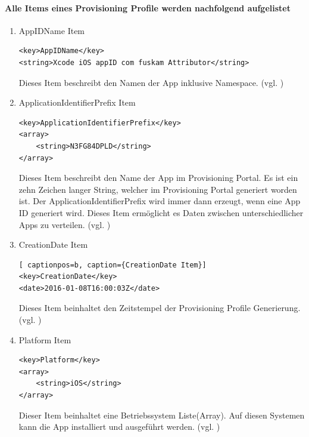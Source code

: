\paragraph{Alle Items eines Provisioning Profile werden nachfolgend aufgelistet}
\begin{enumerate}
    \item AppIDName Item

\begin{lstlisting}[captionpos=b, caption={AppIDName Item}]
<key>AppIDName</key>
<string>Xcode iOS appID com fuskam Attributor</string>
\end{lstlisting}
Dieses Item beschreibt den Namen der App inklusive Namespace. (vgl. \cite{iOSSec[5], Hacking[1]})

    \item ApplicationIdentifierPrefix Item
\begin{lstlisting}[captionpos=b, caption={ApplicationIdentifierPrefix Item}]
<key>ApplicationIdentifierPrefix</key>
<array>
    <string>N3FG84DPLD</string>
</array>
\end{lstlisting}
Dieses Item beschreibt den Name der App im Provisioning Portal. Es ist ein zehn Zeichen langer String, welcher im Provisioning Portal generiert worden ist. Der ApplicationIdentifierPrefix wird immer dann erzeugt, wenn eine App ID generiert wird. Dieses Item ermöglicht es Daten zwischen unterschiedlicher Apps zu verteilen. (vgl. \cite{iOSSec[5], Hacking[1]})

    \item CreationDate Item
\begin{lstlisting}[ captionpos=b, caption={CreationDate Item}]        
<key>CreationDate</key>
<date>2016-01-08T16:00:03Z</date>
\end{lstlisting}
Dieses Item beinhaltet den Zeitstempel der Provisioning Profile Generierung. (vgl. \cite{iOSSec[5], Hacking[1]})

    \item Platform Item
\begin{lstlisting}[captionpos=b, caption={Platform Item}]        
<key>Platform</key>
<array>
    <string>iOS</string>
</array>
\end{lstlisting}
Dieser Item beinhaltet eine Betriebssystem Liste(Array). Auf diesen Systemen kann die App installiert und ausgeführt werden. (vgl. \cite{iOSSec[5], Hacking[1]})


\end{enumerate}
